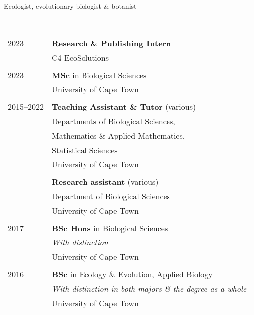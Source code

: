\documentclass[12pt]{article}
\begin{document}



\bigskip

\hspace{6.75em} Ecologist, evolutionary biologist \& botanist

\

\begin{tabular}{ll}
  2023--     & \textbf{Research \& Publishing Intern} \\
             & C4 EcoSolutions \\
             & \\
  2023       & \textbf{MSc} in Biological Sciences \\
             & University of Cape Town \\
             & \\
  2015--2022 & \textbf{Teaching Assistant \& Tutor} (various) \\
             & Departments of Biological Sciences, \\
             & \hspace{1em} Mathematics \& Applied Mathematics, \\
             & \hspace{1em} Statistical Sciences \\
             & University of Cape Town \\
             & \\
             & \textbf{Research assistant} (various) \\
             & Department of Biological Sciences \\
             & University of Cape Town \\
             & \\
  2017       & \textbf{BSc Hons} in Biological Sciences \\
             & \textit{With distinction} \\
             & University of Cape Town \\
             & \\
  2016       & \textbf{BSc} in Ecology \& Evolution, Applied Biology \\
             &\textit{With distinction in both majors \& the degree as a whole} \\
             & University of Cape Town \\
\end{tabular}
\end{document}
